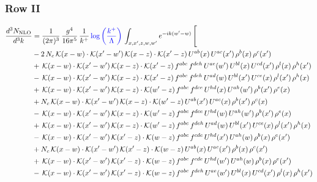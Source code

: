\documentclass[9pt]{article}
\numberwithin{equation}{section}
\begin{document}
\subsubsection{Row II}
\begin{align}
\frac{d^{3}N_{\mathrm{NLO}}}{d^{3}k} & = \frac{1}{(2\pi)^{3}}\,\frac{g^{4}}{16\pi^{5}}\,\frac{1}{k^{+}}\,{\color{blue}\log{\left(\frac{k^{+}}{\Lambda}\right)}}\,\int_{x,x',z,w,w'}e^{-ik(w'-w)}\,\Bigg[\notag\\ &  -2\,N_{c}\,\mathcal{K}(x-w)\cdot\mathcal{K}(x'-w')\,\mathcal{K}(x-z)\cdot\mathcal{K}(x'-z)\,U^{ab}(x)\,U^{ac}(x')\,\rho^{b}(x)\,\rho^{c}(x')\notag\\
& +\,\mathcal{K}(x-w)\cdot\mathcal{K}(x'-w')\,\mathcal{K}(x-z)\cdot\mathcal{K}(x'-z)\,f^{abc}\,f^{deh}\,U^{ae}(w')\,U^{bl}(x)\,U^{cd}(x')\,\rho^{l}(x)\,\rho^{h}(x')\notag\\
& -\,\mathcal{K}(x-w)\cdot\mathcal{K}(x'-w')\,\mathcal{K}(x-z)\cdot\mathcal{K}(x'-z)\,f^{abc}\,f^{deh}\,U^{ad}(w)\,U^{bl}(x')\,U^{ce}(x)\,\rho^{l}(x')\,\rho^{h}(x)\notag\\
& +\,\mathcal{K}(x-w)\cdot\mathcal{K}(x'-w')\,\mathcal{K}(x-z)\cdot\mathcal{K}(w'-z)\,f^{abc}\,f^{dce}\,U^{hd}(x)\,U^{ah}(w')\,\rho^{b}(x')\,\rho^{e}(x)\notag\\
& +N_{c}\,\mathcal{K}(x-w)\cdot\mathcal{K}(x'-w')\,\mathcal{K}(x-z)\cdot\mathcal{K}(w'-z)\,U^{ab}(x')\,U^{ac}(x)\,\rho^{b}(x')\,\rho^{c}(x)\notag\\
& -\,\mathcal{K}(x-w)\cdot\mathcal{K}(x'-w')\,\mathcal{K}(x-z)\cdot\mathcal{K}(w'-z)\,f^{abc}\,f^{dce}\,U^{hd}(w)\,U^{ah}(w')\,\rho^{b}(x')\,\rho^{e}(x)\notag\\
& +\,\mathcal{K}(x-w)\cdot\mathcal{K}(x'-w')\,\mathcal{K}(x-z)\cdot\mathcal{K}(w'-z)\,f^{abc}\,f^{deh}\,U^{ad}(w)\,U^{bl}(x')\,U^{ce}(x)\,\rho^{l}(x')\,\rho^{h}(x)\notag\\
& -\,\mathcal{K}(x-w)\cdot\mathcal{K}(x'-w')\,\mathcal{K}(x'-z)\cdot\mathcal{K}(w-z)\,f^{abc}\,f^{cde}\,U^{hd}(x')\,U^{ah}(w)\,\rho^{b}(x)\,\rho^{e}(x')\notag\\
& +N_{c}\,\mathcal{K}(x-w)\cdot\mathcal{K}(x'-w')\,\mathcal{K}(x'-z)\cdot\mathcal{K}(w-z)\,U^{ab}(x)\,U^{ac}(x')\,\rho^{b}(x)\,\rho^{c}(x')\notag\\
& +\,\mathcal{K}(x-w)\cdot\mathcal{K}(x'-w')\,\mathcal{K}(x'-z)\cdot\mathcal{K}(w-z)\,f^{abc}\,f^{cde}\,U^{hd}(w')\,U^{ah}(w)\,\rho^{b}(x)\,\rho^{e}(x')\notag\\
& -\,\mathcal{K}(x-w)\cdot\mathcal{K}(x'-w')\,\mathcal{K}(x'-z)\cdot\mathcal{K}(w-z)\,f^{abc}\,f^{deh}\,U^{ae}(w')\,U^{bl}(x)\,U^{cd}(x')\,\rho^{l}(x)\,\rho^{h}(x')\notag\\

\end{align}
\end{document}

